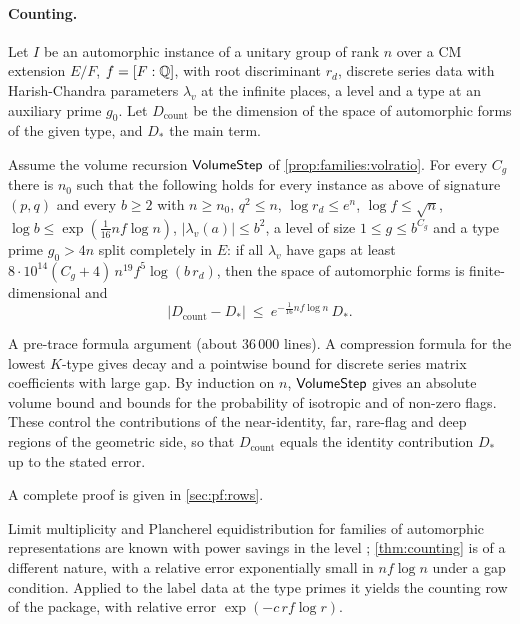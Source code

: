 \paragraph{Counting.}
Let $I$ be an automorphic instance of a unitary group of rank $n$ over a CM extension $E/F$, $f=[F:\mathbb{Q}]$, with
root discriminant $r_d$, discrete series data with Harish-Chandra parameters $\lambda_v$ at the infinite places,
a level and a type at an auxiliary prime $g_0$. Let $D_{\mathrm{count}}$ be the dimension of the space of
automorphic forms of the given type, and $D_*$ the main term.

\begin{theorem}\Fmark\label{thm:counting}
Assume the volume recursion $\mathsf{VolumeStep}$ of \cref{prop:families:volratio}. For every $C_g$ there is
$n_0$ such that the following holds for every instance as above of signature $(p,q)$ and every $b\ge2$ with
$n\ge n_0$, $q^2\le n$, $\log r_d\le e^n$, $\log f\le\sqrt n$, $\log b\le\exp(\tfrac1{16}nf\log n)$,
$|\lambda_v(a)|\le b^2$, a level of size $1\le g\le b^{C_g}$ and a type prime $g_0>4n$ split completely in
$E$: if all $\lambda_v$ have gaps at least $8\cdot10^{14}(C_g+4)\,n^{19}f^5\log(b\,r_d)$, then the space of
automorphic forms is finite-dimensional and
\[
\bigl|D_{\mathrm{count}}-D_*\bigr|\ \le\ e^{-\frac1{16}nf\log n}\,D_* .
\]
\end{theorem}

\begin{proofoutline}
A pre-trace formula argument (about $36\,000$ lines). A compression formula for the lowest $K$-type gives
decay and a pointwise bound for discrete series matrix coefficients with large gap. By induction on $n$,
$\mathsf{VolumeStep}$ gives an absolute volume bound and bounds for the probability of isotropic and of non-zero
flags. These control the contributions of the near-identity, far, rare-flag and deep regions of the geometric
side, so that $D_{\mathrm{count}}$ equals the identity contribution $D_*$ up to the stated error.

A complete proof is given in \cref{sec:pf:rows}.
\end{proofoutline}

\begin{remark}\label{rem:families:counting}
Limit multiplicity and Plancherel equidistribution for families of automorphic representations are known with
power savings in the level \cite{Shin2012,ShinTemplier2016}; \cref{thm:counting} is of a different nature, with a
relative error exponentially small in $nf\log n$ under a gap condition. Applied to the label data at the type
primes it yields the counting row of the package, with relative error $\exp(-c\,rf\log r)$.
\end{remark}

